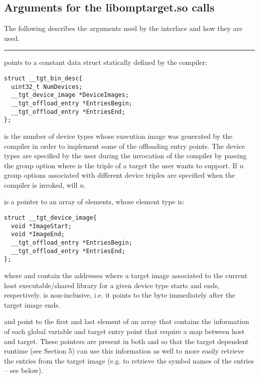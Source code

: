 \subsection{Arguments for the libomptarget.so calls}
The following describes the arguments used by the \libomptarget{} interface and how they are used.

\noindent\rule{\textwidth}{0.4pt}

 points to a constant data struct statically defined by the compiler:
\begin{lstlisting}
struct __tgt_bin_desc{
  uint32_t NumDevices; 
  __tgt_device_image *DeviceImages; 
  __tgt_offload_entry *EntriesBegin;
  __tgt_offload_entry *EntriesEnd; 
};
\end{lstlisting}

 is the number of device types whose execution image was generated by the compiler in order to implement some of the offloading entry points. The device types are specified by the user during the invocation of the compiler by passing the group option  where  is the triple of a target the user wants to support. If $n$ group options   associated with different device triples are specified when the compiler is invoked,  will $n$.

 is a pointer to an array of  elements, whose element type is:
\begin{lstlisting}
struct __tgt_device_image{
  void *ImageStart;
  void *ImageEnd;
  __tgt_offload_entry *EntriesBegin;
  __tgt_offload_entry *EntriesEnd; 
};
\end{lstlisting}
%
where  and  contain the addresses where a target image associated to the current host executable/shared library for a given device type starts and ends, respectively.  is non-inclusive, i.e. it points to the byte immediately after the target image ends.

 and  point to the first and last element of an array that contains the information of each global variable and target entry point that require a map between host and target. These pointers are present in both  and  so that the target dependent runtime (see Section 5) can use this information as well to more easily retrieve the entries from the target image (e.g. to retrieve the symbol names of the entries – see below). 

